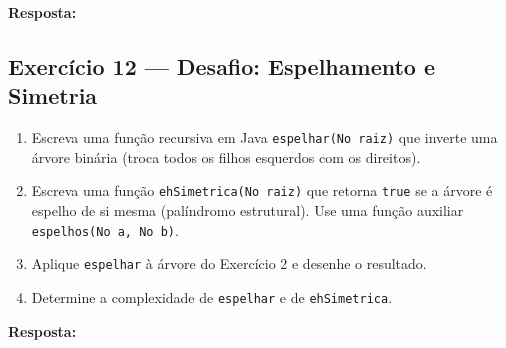 \documentclass[12pt, a4paper]{article}
\newenvironment{resposta}{%
    \begin{mdframed}[linecolor=black!30, backgroundcolor=white,
                     innertopmargin=10pt, innerbottommargin=30pt,
                     skipabove=6pt]
    \textbf{Resposta:}\\[4pt]
}{%
    \end{mdframed}
}
\begin{document}
\begin{resposta}
\vspace{5cm}
\end{resposta}

\newpage
\subsection*{Exercício 12 — Desafio: Espelhamento e Simetria}

\begin{enumerate}[label=(\alph*)]
    \item Escreva uma função recursiva em Java \texttt{espelhar(No raiz)} que inverte uma árvore binária (troca todos os filhos esquerdos com os direitos).
    \item Escreva uma função \texttt{ehSimetrica(No raiz)} que retorna \texttt{true} se a árvore é espelho de si mesma (palíndromo estrutural). Use uma função auxiliar \texttt{espelhos(No a, No b)}.
    \item Aplique \texttt{espelhar} à árvore do Exercício 2 e desenhe o resultado.
    \item Determine a complexidade de \texttt{espelhar} e de \texttt{ehSimetrica}.
\end{enumerate}

\begin{resposta}
\vspace{6cm}
\end{resposta}
\end{document}
